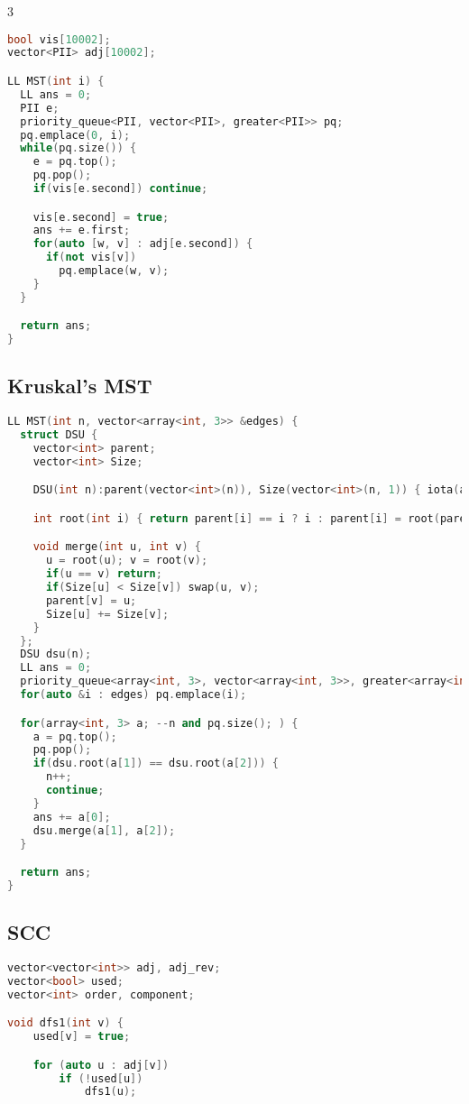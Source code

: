 \documentclass[10pt,a4paper,landscape]{article}
\begin{document}
\begin{multicols}{3}
\begin{lstlisting}[language=C++, breaklines=true]
bool vis[10002];
vector<PII> adj[10002];

LL MST(int i) {
  LL ans = 0;
  PII e;
  priority_queue<PII, vector<PII>, greater<PII>> pq;
  pq.emplace(0, i);
  while(pq.size()) {
    e = pq.top();
    pq.pop();
    if(vis[e.second]) continue;

    vis[e.second] = true;
    ans += e.first;
    for(auto [w, v] : adj[e.second]) {
      if(not vis[v])
        pq.emplace(w, v);
    }
  }

  return ans;
}
\end{lstlisting}

\subsection{Kruskal's MST}
\begin{lstlisting}[language=C++, breaklines=true]
LL MST(int n, vector<array<int, 3>> &edges) {
  struct DSU {
    vector<int> parent;
    vector<int> Size;

    DSU(int n):parent(vector<int>(n)), Size(vector<int>(n, 1)) { iota(all(parent), 0); }

    int root(int i) { return parent[i] == i ? i : parent[i] = root(parent[i]); }

    void merge(int u, int v) {
      u = root(u); v = root(v);
      if(u == v) return;
      if(Size[u] < Size[v]) swap(u, v);
      parent[v] = u;
      Size[u] += Size[v];
    }
  };
  DSU dsu(n);
  LL ans = 0;
  priority_queue<array<int, 3>, vector<array<int, 3>>, greater<array<int, 3>>> pq;
  for(auto &i : edges) pq.emplace(i);

  for(array<int, 3> a; --n and pq.size(); ) {
    a = pq.top();
    pq.pop();
    if(dsu.root(a[1]) == dsu.root(a[2])) {
      n++;
      continue;
    }
    ans += a[0];
    dsu.merge(a[1], a[2]);
  }

  return ans;
}
\end{lstlisting}

\subsection{SCC}
\begin{lstlisting}[language=C++, breaklines=true]
vector<vector<int>> adj, adj_rev;
vector<bool> used;
vector<int> order, component;

void dfs1(int v) {
    used[v] = true;

    for (auto u : adj[v])
        if (!used[u])
            dfs1(u);


\end{lstlisting}
\end{multicols}
\end{document}
